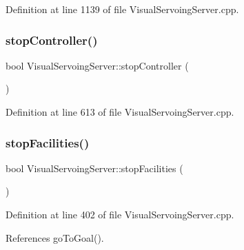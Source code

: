Definition at line 1139 of file Visual\+Servoing\+Server.\+cpp.

\mbox{\label{classVisualServoingServer_a4a21e5698a1d3b8db7c82772252bd215}} 
\subsubsection{\texorpdfstring{stop\+Controller()}{stopController()}}
{\footnotesize\ttfamily bool Visual\+Servoing\+Server\+::stop\+Controller (\begin{DoxyParamCaption}{ }\end{DoxyParamCaption})\hspace{0.3cm}{\ttfamily [override]}}



Definition at line 613 of file Visual\+Servoing\+Server.\+cpp.

\mbox{\label{classVisualServoingServer_a0cd7a77750df9c1faaf1a18be6305de9}} 
\subsubsection{\texorpdfstring{stop\+Facilities()}{stopFacilities()}}
{\footnotesize\ttfamily bool Visual\+Servoing\+Server\+::stop\+Facilities (\begin{DoxyParamCaption}{ }\end{DoxyParamCaption})\hspace{0.3cm}{\ttfamily [override]}}



Definition at line 402 of file Visual\+Servoing\+Server.\+cpp.



References go\+To\+Goal().

